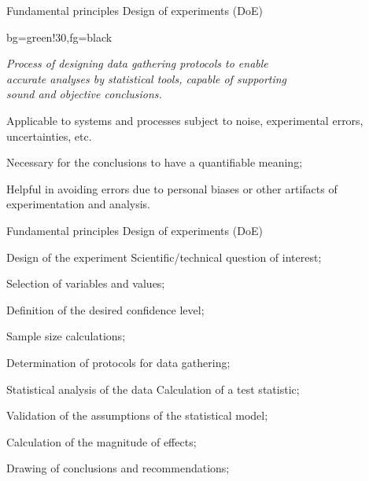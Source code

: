 \documentclass[t]{beamer}
\begin{document}

\begin{ftst}
{Fundamental principles}
{Design of experiments (DoE)}
\vone
\begin{colorblock}{}{bg=green!30,fg=black}
\begin{center}
\textit{Process of designing data gathering protocols to enable\\
accurate analyses by statistical tools, capable of supporting\\
sound and objective conclusions.}
\end{center}
\end{colorblock}

\bitems Applicable to systems and processes subject to noise, experimental errors, uncertainties, etc.
	\item Necessary for the conclusions to have a quantifiable meaning;
	\item Helpful in avoiding errors due to personal biases or other artifacts of experimentation and analysis.
\eitem
\end{ftst}


\begin{ftst}
{Fundamental principles}
{Design of experiments (DoE)}
\begin{block}{Design of the experiment}
	\small
	\bitems Scientific/technical question of interest;
		\item Selection of variables and values;
		\item Definition of the desired confidence level;
		\item Sample size calculations;
		\item Determination of protocols for data gathering;
	\eitem
\end{block}
\begin{block}{Statistical analysis of the data}
	\small
	\bitems Calculation of a test statistic;
		\item Validation of the assumptions of the statistical model;
		\item Calculation of the magnitude of effects;
		\item Drawing of conclusions and recommendations;
	\eitem
\end{block}
\end{ftst}

\end{document}
